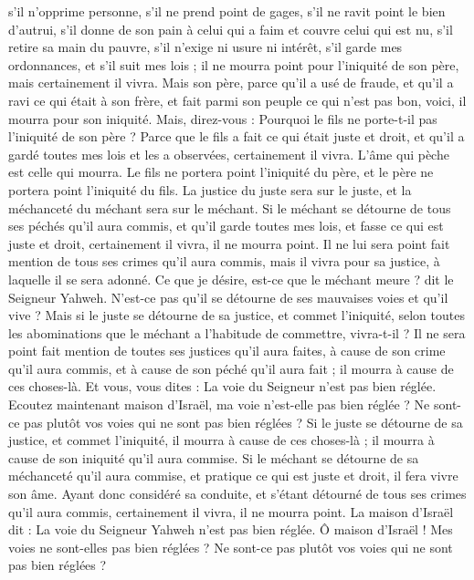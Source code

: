 \begin{multicols}{2}
s’il n’opprime personne, s’il ne prend point de gages, s’il ne ravit point le bien d'autrui, s’il donne de son pain à celui qui a faim et couvre celui qui est nu,
s’il retire sa main du pauvre, s’il n’exige ni usure ni intérêt, s’il garde mes ordonnances, et s’il suit mes lois ; il ne mourra point pour l'iniquité de son père, mais certainement il vivra.
Mais son père, parce qu'il a usé de fraude, et qu'il a ravi ce qui était à son frère, et fait parmi son peuple ce qui n'est pas bon, voici, il mourra pour son iniquité.
Mais, direz-vous : Pourquoi le fils ne porte-t-il pas l'iniquité de son père\FTNT{} ? Parce que le fils a fait ce qui était juste et droit, et qu'il a gardé toutes mes lois et les a observées, certainement il vivra.
L'âme qui pèche est celle qui mourra. Le fils ne portera point l'iniquité du père, et le père ne portera point l'iniquité du fils. La justice du juste sera sur le juste, et la méchanceté du méchant sera sur le méchant.
Si le méchant se détourne de tous ses péchés qu'il aura commis, et qu'il garde toutes mes lois, et fasse ce qui est juste et droit, certainement il vivra, il ne mourra point.
Il ne lui sera point fait mention de tous ses crimes qu'il aura commis, mais il vivra pour sa justice, à laquelle il se sera adonné.
Ce que je désire, est-ce que le méchant meure ? dit le Seigneur Yahweh. N’est-ce pas qu'il se détourne de ses mauvaises voies et qu'il vive ?
Mais si le juste se détourne de sa justice, et commet l'iniquité, selon toutes les abominations que le méchant a l’habitude de commettre, vivra-t-il ? Il ne sera point fait mention de toutes ses justices qu'il aura faites, à cause de son crime qu'il aura commis, et à cause de son péché qu'il aura fait ; il mourra à cause de ces choses-là.
Et vous, vous dites : La voie du Seigneur n'est pas bien réglée. Ecoutez maintenant maison d'Israël, ma voie n'est-elle pas bien réglée ? Ne sont-ce pas plutôt vos voies qui ne sont pas bien réglées ?
Si le juste se détourne de sa justice, et commet l'iniquité, il mourra à cause de ces choses-là ; il mourra à cause de son iniquité qu'il aura commise.
Si le méchant se détourne de sa méchanceté qu'il aura commise, et pratique ce qui est juste et droit, il fera vivre son âme.
Ayant donc considéré sa conduite, et s'étant détourné de tous ses crimes qu'il aura commis, certainement il vivra, il ne mourra point.
La maison d'Israël dit : La voie du Seigneur Yahweh n'est pas bien réglée. Ô maison d'Israël ! Mes voies ne sont-elles pas bien réglées ? Ne sont-ce pas plutôt vos voies qui ne sont pas bien réglées ?

\end{multicols}
